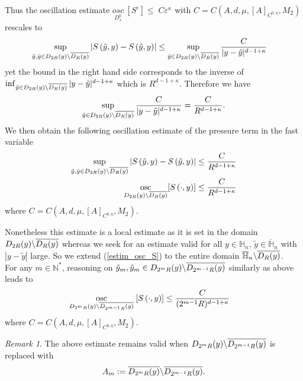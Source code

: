 \documentclass[11pt, reqno]{amsart}
\theoremstyle{definition}
\theoremstyle{remark}
\newtheorem{remark}[theorem]{Remark}
\numberwithin{equation}{section}
\newcommand{\bs}{\symbol{92}}
\DeclareMathOperator*{\osc}{osc}
\begin{document}
	\noindent Thus the oscillation estimate  $\underset{D_x^0}{osc}\ [S^{\varepsilon}]\leq   \; C \varepsilon^\kappa$ with $ C=C(A, d, \mu, [A]_{C^{0,\eta}},M_2)$ rescales to 
	\begin{align*}
		\sup_{\tilde{y},\hat{y}\in D_{2R}(y) \bs \overline{D_R(y)}}  \left|  S\left( \tilde{y},y\right)-  S\left( \hat{y},y\right)\right|  &\leq  \sup_{\tilde{y}\in D_{2R}(y) \bs \overline{D_R(y)}}\frac{C}{|y-\tilde{y}|^{d-1+\kappa}} 
	\end{align*}
	yet the bound in the right hand side corresponds to the inverse of $\inf_{\tilde{y}\in D_{2R}(y) \bs \overline{D_R(y)}} |y-\tilde{y}|^{d-1+\kappa}$ which is $R^{d-1+\kappa}$. Therefore we have
	\begin{align*}
		\sup_{\tilde{y}\in D_{2R}(y) \bs \overline{D_R(y)}}\frac{C}{|y-\tilde{y}|^{d-1+\kappa}} = \frac{C}{R^{d-1+\kappa}} . 
	\end{align*}
	We then obtain the following oscillation estimate of the pressure term in the fast variable
	\begin{align}
		\sup_{\tilde{y},\hat{y}\in  D_{2R}(y) \bs \overline{D_R(y)} }  \left|  S\left( \tilde{y},y\right)-   S\left( \hat{y},y\right)\right|  &\leq \frac{C}{R^{d-1+\kappa}}   \nonumber \\
		\osc_{ D_{2R}(y) \bs \overline{D_R(y)}} [ S\left( \cdot,y\right)] &\leq \frac{C}{R^{d-1+\kappa}} \label{estim_osc_S}   \end{align}
	where $ C=C(A, d, \mu, [A]_{C^{0,\eta}},M_2)$.
	
	\noindent Nonetheless this estimate is  a local estimate as it is set in the domain $ D_{2R}(y) \bs \overline{D_R(y)}$ whereas we seek for an estimate valid for all $y\in \mathbb{H}_n$, $\tilde{y}\in \overline{\mathbb{H}}_n$ with $|y-\tilde{y}|$ large. So we extend (\ref{estim_osc_S}) to the entire domain  $\overline{\mathbb{H}}_n\bs \overline{D_R(y)}$.\\
	
	\noindent For any $m\in\mathbb{N}^*$, reasoning on $\tilde{y}_m,\hat{y}_{m}\in  D_{2^mR}(y) \bs \overline{D_{2^{m-1}R}(y) } $ similarly as above leads to 
	\begin{align*}
		\osc_{ D_{2^mR}(y) \bs \overline{D_{2^{m-1}R}(y) }} \:  [S\left( \cdot,y\right)] &\leq \frac{C}{(2^{m-1}R)^{d-1+\kappa}}  \end{align*}
		where $ C=C(A, d, \mu, [A]_{C^{0,\eta}},M_2)$.
		
	\begin{remark}
		The above estimate remains valid when $ D_{2^mR}(y) \bs \overline{D_{2^{m-1}R}(y) }$ is replaced with
		\begin{equation*}
		A_m:= \overline{D_{2^mR}(y)} \bs \overline{D_{2^{m-1}R}(y) }.
		\end{equation*} 
	\end{remark}
	
\end{document}
